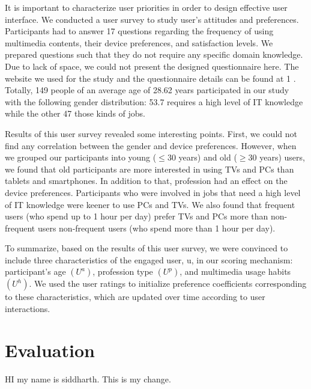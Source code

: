 \documentclass[]{IEEEphot}
\begin{document}
It is important to characterize user priorities in order to design effective user
interface. We conducted a user survey to study user’s attitudes and preferences.
Participants had to answer 17 questions regarding the frequency of using multimedia contents, their device preferences, and satisfaction levels. We prepared
questions such that they do not require any specific domain knowledge. Due to
lack of space, we could not present the designed questionnaire here. The website
we used for the study and the questionnaire details can be found at 1
. Totally,
149 people of an average age of 28.62 years participated in our study with the
following gender distribution: 53.7%
requires a high level of IT knowledge while the other 47%
those kinds of jobs.



Results of this user survey revealed some interesting points. First, we could
not find any correlation between the gender and device preferences. However,
when we grouped our participants into young ($\leq$30 years) and old ($\geq$30 years)
users, we found that old participants are more interested in using TVs and PCs
than tablets and smartphones. In addition to that, profession had an effect on
the device preferences. Participants who were involved in jobs that need a high
level of IT knowledge were keener to use PCs and TVs. We also found that
frequent users (who spend up to 1 hour per day) prefer TVs and PCs more than
non-frequent users non-frequent users (who spend more than 1 hour per day).


To summarize, based on the results of this user survey, we were convinced to
include three characteristics of the engaged user, u, in our scoring mechanism:
participant’s age $(U^{a})$, profession type $(U^{p})$, and multimedia usage habits $(U^{h})$.
We used the user ratings to initialize preference coefficients corresponding to
these characteristics, which are updated over time according to user interactions.



\section{Evaluation}
HI my name is siddharth. This is my change.
\end{document}

